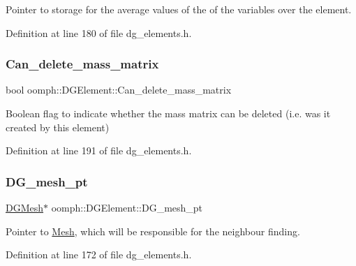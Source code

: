Pointer to storage for the average values of the of the variables over the element. 



Definition at line 180 of file dg\+\_\+elements.\+h.

\mbox{\label{classoomph_1_1DGElement_a13357b2bf3bc7703050c6909d0ece927}} 
\subsubsection{\texorpdfstring{Can\+\_\+delete\+\_\+mass\+\_\+matrix}{Can\_delete\_mass\_matrix}}
{\footnotesize\ttfamily bool oomph\+::\+D\+G\+Element\+::\+Can\+\_\+delete\+\_\+mass\+\_\+matrix\hspace{0.3cm}{\ttfamily [protected]}}



Boolean flag to indicate whether the mass matrix can be deleted (i.\+e. was it created by this element) 



Definition at line 191 of file dg\+\_\+elements.\+h.

\mbox{\label{classoomph_1_1DGElement_a247d118e3d474c7b56b8e93db1d5256d}} 
\subsubsection{\texorpdfstring{D\+G\+\_\+mesh\+\_\+pt}{DG\_mesh\_pt}}
{\footnotesize\ttfamily \hyperlink{classoomph_1_1DGMesh}{D\+G\+Mesh}$\ast$ oomph\+::\+D\+G\+Element\+::\+D\+G\+\_\+mesh\+\_\+pt\hspace{0.3cm}{\ttfamily [protected]}}



Pointer to \hyperlink{classoomph_1_1Mesh}{Mesh}, which will be responsible for the neighbour finding. 



Definition at line 172 of file dg\+\_\+elements.\+h.

